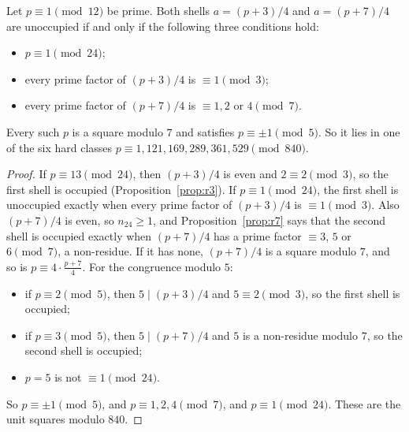 \begin{proposition}\label{prop:survivors}
Let $p\equiv1\pmod{12}$ be prime. Both shells $a=(p+3)/4$ and $a=(p+7)/4$ are unoccupied if and only if the following three conditions hold:
\begin{itemize}
\item $p\equiv1\pmod{24}$;
\item every prime factor of $(p+3)/4$ is $\equiv1\pmod3$;
\item every prime factor of $(p+7)/4$ is $\equiv1,2$ or $4\pmod7$.
\end{itemize}
Every such $p$ is a square modulo $7$ and satisfies $p\equiv\pm1\pmod5$. So it lies in one of the six hard classes $p\equiv1,121,169,289,361,529\pmod{840}$.
\end{proposition}
\begin{proof}
If $p\equiv13\pmod{24}$, then $(p+3)/4$ is even and $2\equiv2\pmod3$, so the first shell is occupied (Proposition~\ref{prop:r3}). If $p\equiv1\pmod{24}$, the first shell is unoccupied exactly when every prime factor of $(p+3)/4$ is $\equiv1\pmod3$. Also $(p+7)/4$ is even, so $n_{24}\ge1$, and Proposition~\ref{prop:r7} says that the second shell is occupied exactly when $(p+7)/4$ has a prime factor $\equiv3$, $5$ or $6\pmod7$, a non-residue. If it has none, $(p+7)/4$ is a square modulo $7$, and so is $p\equiv4\cdot\frac{p+7}4$.
For the congruence modulo $5$:
\begin{itemize}
\item if $p\equiv2\pmod5$, then $5\mid(p+3)/4$ and $5\equiv2\pmod3$, so the first shell is occupied;
\item if $p\equiv3\pmod5$, then $5\mid(p+7)/4$ and $5$ is a non-residue modulo $7$, so the second shell is occupied;
\item $p=5$ is not $\equiv1\pmod{24}$.
\end{itemize}
So $p\equiv\pm1\pmod5$, and $p\equiv1,2,4\pmod7$, and $p\equiv1\pmod{24}$. These are the unit squares modulo $840$.
\end{proof}

